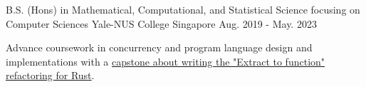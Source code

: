 

\begin{cventries}

  \cventry
    {B.S. (Hons) in Mathematical, Computational, and Statistical Science focusing on Computer Sciences} %
    {Yale-NUS College} %
    {Singapore} %
    {Aug. 2019 - May. 2023} %
    {
      \begin{cvitems} %
        \item {Advance coursework in concurrency and program language design and implementations with a \href{https://www.google.com}{capstone about writing the "Extract to function" refactoring for Rust}.}
      \end{cvitems}
    }

\end{cventries}
